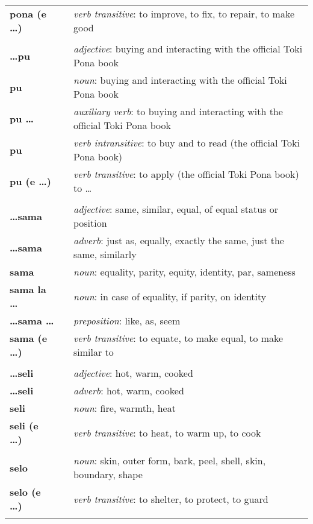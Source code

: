 \begin{supertabular}{p{2,5cm}|ll}
\textbf{pona (e \dots)} && \textit{verb transitive}: to improve, to fix, to repair, to make good \\ 
 && \\ %
\textbf{\dots pu} && \textit{adjective}: buying and interacting with the official Toki Pona book \\ 
\textbf{pu} && \textit{noun}: buying and interacting with the official Toki Pona book \\ 
\textbf{pu \dots} && \textit{auxiliary verb}: to buying and interacting with the official Toki Pona book \\ 
\textbf{pu} && \textit{verb intransitive}:  to buy and to read (the official Toki Pona book) \\
\textbf{pu (e \dots)} && \textit{verb transitive}: to apply (the official Toki Pona book) to \dots \\
 && \\ %
\textbf{\dots sama} && \textit{adjective}: same, similar, equal, of equal status or position \\ 
\textbf{\dots sama} && \textit{adverb}: just as, equally, exactly the same, just the same, similarly \\ 
\textbf{sama} && \textit{noun}: equality, parity, equity, identity, par, sameness \\ 
\textbf{sama la \dots} && \textit{noun}: in case of equality, if parity, on identity  \\ 
\textbf{\dots sama \dots} && \textit{preposition}: like, as, seem \\ 
\textbf{sama (e \dots)} && \textit{verb transitive}: to equate, to make equal, to make similar to \\ 
 && \\ %
\textbf{\dots seli} && \textit{adjective}: hot, warm, cooked \\ 
\textbf{\dots seli} && \textit{adverb}: hot, warm, cooked \\ 
\textbf{seli} && \textit{noun}: fire, warmth, heat \\ 
\textbf{seli (e \dots)} && \textit{verb transitive}: to heat, to warm up, to cook \\ 
 && \\ %
\textbf{selo} && \textit{noun}: skin, outer form, bark, peel, shell, skin, boundary, shape \\ 
\textbf{selo (e \dots)} && \textit{verb transitive}: to shelter, to protect, to guard \\ 
 && \\ %

\end{supertabular}
